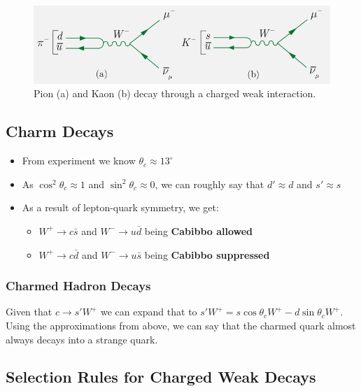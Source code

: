 \begin{figure}[h!]
\centering
\includegraphics[width = .8\textwidth]{kaon_pion_decay.png}
\caption{Pion (a) and Kaon (b) decay through a charged weak interaction.}
\label{fig: kaon_pion_decay}
\end{figure}


\subsection{Charm Decays}   
\begin{itemize}
    \item From experiment we know $θ_{c} \approx 13 ^∘$
    \item As $\cos ^2 θ_c \approx 1$ and $\sin ^2 θ_c \approx 0$, we can roughly say that $d' \approx d$ and $s' \approx s$
    \item As a result of lepton-quark symmetry, we get: 
    \begin{itemize}
        \item $W^{+} → c \bar{s}$ and $W^{-} → u \bar{d}$ being \textbf{Cabibbo allowed}
        \item $W^{+} → c \bar{d}$ and $W^{-} → u \bar{s}$ being \textbf{Cabibbo suppressed}
    \end{itemize}
\end{itemize}

\subsubsection{Charmed Hadron Decays}
Given that $c → s'W^{+}$ we can expand that to $s'W^{+} = s \cos θ_c W^{+} - d \sin θ_c W^{+}$. Using the approximations from above, we can say that the charmed quark almost always decays into a strange quark.

\subsection{Selection Rules for Charged Weak Decays}
